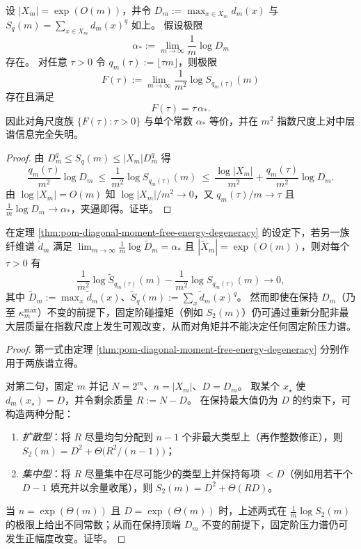\begin{theorem}\label{thm:pom-diagonal-moment-free-energy-degeneracy}
设 \(|X_m|=\exp(O(m))\)，并令
\(
D_m:=\max_{x\in X_m} d_m(x)
\)
与
\(
S_q(m)=\sum_{x\in X_m} d_m(x)^q
\)
如上。
假设极限
\[
\alpha_*:=\lim_{m\to\infty}\frac{1}{m}\log D_m
\]
存在。
对任意 \(\tau>0\) 令 \(q_m(\tau):=\lfloor\tau m\rfloor\)，则极限
\[
F(\tau):=\lim_{m\to\infty}\frac{1}{m^2}\log S_{q_m(\tau)}(m)
\]
存在且满足
\[
\boxed{\;F(\tau)=\tau\,\alpha_*.\;}
\]
因此对角尺度族 \(\{F(\tau):\tau>0\}\) 与单个常数 \(\alpha_*\) 等价，并在 \(m^2\) 指数尺度上对中层谱信息完全失明。
\end{theorem}
\begin{proof}
由 \(D_m^{q}\le S_q(m)\le |X_m|D_m^q\) 得
\[
\frac{q_m(\tau)}{m^2}\log D_m
\ \le\
\frac{1}{m^2}\log S_{q_m(\tau)}(m)
\ \le\
\frac{\log|X_m|}{m^2}+\frac{q_m(\tau)}{m^2}\log D_m.
\]
由 \(\log|X_m|=O(m)\) 知 \(\log|X_m|/m^2\to 0\)，又 \(q_m(\tau)/m\to\tau\) 且 \(\frac{1}{m}\log D_m\to\alpha_*\)，夹逼即得。证毕。
\end{proof}

\begin{corollary}[对角观测的强不可识别性：固定顶端而中层压力仍可变]\label{cor:pom-diagonal-observation-strong-unidentifiability}
在定理 \ref{thm:pom-diagonal-moment-free-energy-degeneracy} 的设定下，若另一族纤维谱 \(\tilde d_m\) 满足
\(
\lim_{m\to\infty}\frac{1}{m}\log \tilde D_m=\alpha_*
\)
且 \(|\tilde X_m|=\exp(O(m))\)，则对每个 \(\tau>0\) 有
\[
\frac{1}{m^2}\log \tilde S_{q_m(\tau)}(m)-\frac{1}{m^2}\log S_{q_m(\tau)}(m)\to 0,
\]
其中 \(\tilde D_m:=\max_x \tilde d_m(x)\)、\(\tilde S_q(m):=\sum_x \tilde d_m(x)^q\)。
然而即使在保持 \(D_m\)（乃至 \(\kappa_m^{\mathrm{max}}\)）不变的前提下，固定阶碰撞矩（例如 \(S_2(m)\)）仍可通过重新分配非最大层质量在指数尺度上发生可观改变，从而对角矩并不能决定任何固定阶压力谱。
\end{corollary}
\begin{proof}
第一式由定理 \ref{thm:pom-diagonal-moment-free-energy-degeneracy} 分别作用于两族谱立得。
\par
对第二句，固定 \(m\) 并记 \(N=2^m\)、\(n=|X_m|\)、\(D=D_m\)。
取某个 \(x_\star\) 使 \(d_m(x_\star)=D\)，并令剩余质量 \(R:=N-D\)。
在保持最大值仍为 \(D\) 的约束下，可构造两种分配：
\begin{enumerate}
  \item \emph{扩散型}：将 \(R\) 尽量均匀分配到 \(n-1\) 个非最大类型上（再作整数修正），则
  \(
  S_2(m)=D^2+\Theta\!\bigl(R^2/(n-1)\bigr)
  \)；
  \item \emph{集中型}：将 \(R\) 尽量集中在尽可能少的类型上并保持每项 \(<D\)（例如用若干个 \(D-1\) 填充并以余量收尾），则
  \(
  S_2(m)=D^2+\Theta(RD)
  \)。
\end{enumerate}
当 \(n=\exp(\Theta(m))\) 且 \(D=\exp(\Theta(m))\) 时，上述两式在 \(\frac1m\log S_2(m)\) 的极限上给出不同常数；从而在保持顶端 \(D_m\) 不变的前提下，固定阶压力谱仍可发生正幅度改变。证毕。
\end{proof}

